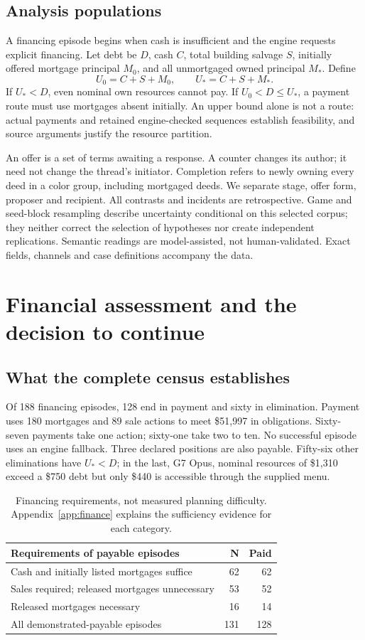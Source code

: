 \subsection{Analysis populations}
A financing episode begins when cash is insufficient and the engine requests explicit financing. Let debt be $D$, cash $C$, total building salvage $S$, initially offered mortgage principal $M_0$, and all unmortgaged owned principal $M_*$. Define
\[
U_0=C+S+M_0,\qquad U_*=C+S+M_*.
\]
If $U_*<D$, even nominal own resources cannot pay. If $U_0<D\leq U_*$, a payment route must use mortgages absent initially. An upper bound alone is not a route: actual payments and retained engine-checked sequences establish feasibility, and source arguments justify the resource partition.

An offer is a set of terms awaiting a response. A counter changes its author; it need not change the thread's initiator. Completion refers to newly owning every deed in a color group, including mortgaged deeds. We separate stage, offer form, proposer and recipient. All contrasts and incidents are retrospective. Game and seed-block resampling describe uncertainty conditional on this selected corpus; they neither correct the selection of hypotheses nor create independent replications. Semantic readings are model-assisted, not human-validated. Exact fields, channels and case definitions accompany the data.

\section{Financial assessment and the decision to continue}
\label{sec:execution}
\subsection{What the complete census establishes}
Of 188 financing episodes, 128 end in payment and sixty in elimination. Payment uses 180 mortgages and 89 sale actions to meet \$51,997 in obligations. Sixty-seven payments take one action; sixty-one take two to ten. No successful episode uses an engine fallback. Three declared positions are also payable. Fifty-six other eliminations have $U_*<D$; in the last, G7 Opus, nominal resources of \$1,310 exceed a \$750 debt but only \$440 is accessible through the supplied menu.

\begin{table}[t]\centering\small
\begin{tabularx}{\linewidth}{@{}Yrr@{}}\toprule
Requirements of payable episodes & N & Paid\\\midrule
Cash and initially listed mortgages suffice &62&62\\
Sales required; released mortgages unnecessary &53&52\\
Released mortgages necessary &16&14\\\midrule
All demonstrated-payable episodes &131&128\\\bottomrule
\end{tabularx}
\caption{Financing requirements, not measured planning difficulty. Appendix~\ref{app:finance} explains the sufficiency evidence for each category.}\label{tab:debt-requirements}
\end{table}


